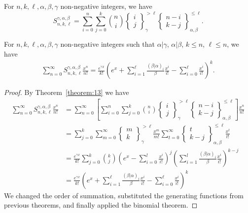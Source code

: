 \documentclass[10pt,a4paper]{amsart}
\def\sts#1#2{\begin{Bmatrix}
#1 \\ #2 \end{Bmatrix}}
\begin{document}
 \begin{theorem}\label{theorem:13}For $ n,k, \ell,\alpha, \beta, \gamma$ non-negative integers, we have
	\begin{equation}\label{equation:5}
S^{\gamma,\alpha,\beta}_{n,k,\ell}=\sum\limits_{i=0}^n\sum\limits_{j=0}^k\binom{n}{i}\sts{i}{j}_\gamma^{> \ell}\sts{n-i}{k-j}_{\alpha,\beta}^{\leq \ell}. 
	\end{equation}
\end{theorem}

\begin{theorem}\label{theorem:20}For $n,k,\ell, \alpha,\beta,\gamma$ non-negative integers such that $\alpha|\gamma$, $\alpha|\beta$, $k\leq n$, $\ell\leq n$,  we have
	\begin{align}\label{equation:1}
	\sum_{n=0}^{\infty}S^{\gamma,\alpha,\beta}_{n,k,\ell} \frac{x^n}{n!}=\frac{e^{\gamma x}}{k!}\left(e^x+\sum_{i=1}^{\ell}\frac{(\beta|\alpha)_i}{\beta}\frac{x^i}{i!}-\sum_{i=0}^{\ell}\frac{x^i}{i!}\right)^k.
\end{align}
\end{theorem}

\begin{proof} By Theorem~\ref{theorem:13}  we have
\begin{align*}
\sum\limits_{n=0}^\infty 	S^{\gamma,\alpha,\beta}_{n,k,\ell}\frac{x^n}{n!}&=	\sum_{n=0}^{\infty}\left[
		\sum_{i=0}^n\sum_{j=0}^k\binom{n}{i}\sts{i}{j}_{\gamma}^{> \ell}\sts{n-i}{k-j}_{\alpha,\beta}^{\leq \ell}
	\right]\frac{x^n}{n!} \\&=\sum_{j=0}^k	\sum_{m=0}^\infty\sts{m}{k}_{\gamma}^{>\ell}\frac{x^m}{m!}\sum_{t=0}^\infty\sts{t}{k-j}_{\alpha,\beta}^{\leq \ell}\frac{x^t}{t!}\\&=
		\frac{{e^{\gamma x}}}{k!}\sum_{j=0}^k{\binom{k}{j}}
			\left(e^x-\sum\limits_{i=0}^l\frac{x^i}{i!}\right)^j\left(
			\sum\limits_{i=1}^l\frac{(\beta|\alpha)_{i}}{\beta}
			\frac{x^i}{i!}\right)^{k-j}
        \\
        &= \frac{e^{\gamma x}}{k!}\left(e^x+\sum_{i=1}^\ell\frac{(\beta|\alpha)_i}{\beta}\frac{x^i}{i!}-\sum_{i=0}^{\ell}\frac{x^i}{i!}\right)^k
	\end{align*}
We changed the order of summation, substituted the generating functions from previous theorems, and finally applied the binomial theorem. 

\end{proof}
\end{document}
